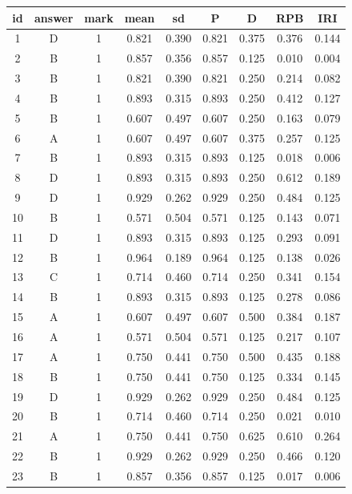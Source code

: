 \documentclass[hyperref,adobefonts]{ctexart}
\begin{document}
\begin{longtable}{c|c|c|c|c|c|c|c|c}
\hline
id & answer & mark & mean & sd & P & D & RPB & IRI\\
\hline
1 & D & 1 & 0.821 & 0.390 & 0.821 & 0.375 & 0.376 & 0.144\\
\hline
2 & B & 1 & 0.857 & 0.356 & 0.857 & 0.125 & 0.010 & 0.004\\
\hline
3 & B & 1 & 0.821 & 0.390 & 0.821 & 0.250 & 0.214 & 0.082\\
\hline
4 & B & 1 & 0.893 & 0.315 & 0.893 & 0.250 & 0.412 & 0.127\\
\hline
5 & B & 1 & 0.607 & 0.497 & 0.607 & 0.250 & 0.163 & 0.079\\
\hline
6 & A & 1 & 0.607 & 0.497 & 0.607 & 0.375 & 0.257 & 0.125\\
\hline
7 & B & 1 & 0.893 & 0.315 & 0.893 & 0.125 & 0.018 & 0.006\\
\hline
8 & D & 1 & 0.893 & 0.315 & 0.893 & 0.250 & 0.612 & 0.189\\
\hline
9 & D & 1 & 0.929 & 0.262 & 0.929 & 0.250 & 0.484 & 0.125\\
\hline
10 & B & 1 & 0.571 & 0.504 & 0.571 & 0.125 & 0.143 & 0.071\\
\hline
11 & D & 1 & 0.893 & 0.315 & 0.893 & 0.125 & 0.293 & 0.091\\
\hline
12 & B & 1 & 0.964 & 0.189 & 0.964 & 0.125 & 0.138 & 0.026\\
\hline
13 & C & 1 & 0.714 & 0.460 & 0.714 & 0.250 & 0.341 & 0.154\\
\hline
14 & B & 1 & 0.893 & 0.315 & 0.893 & 0.125 & 0.278 & 0.086\\
\hline
15 & A & 1 & 0.607 & 0.497 & 0.607 & 0.500 & 0.384 & 0.187\\
\hline
16 & A & 1 & 0.571 & 0.504 & 0.571 & 0.125 & 0.217 & 0.107\\
\hline
17 & A & 1 & 0.750 & 0.441 & 0.750 & 0.500 & 0.435 & 0.188\\
\hline
18 & B & 1 & 0.750 & 0.441 & 0.750 & 0.125 & 0.334 & 0.145\\
\hline
19 & D & 1 & 0.929 & 0.262 & 0.929 & 0.250 & 0.484 & 0.125\\
\hline
20 & B & 1 & 0.714 & 0.460 & 0.714 & 0.250 & 0.021 & 0.010\\
\hline
21 & A & 1 & 0.750 & 0.441 & 0.750 & 0.625 & 0.610 & 0.264\\
\hline
22 & B & 1 & 0.929 & 0.262 & 0.929 & 0.250 & 0.466 & 0.120\\
\hline
23 & B & 1 & 0.857 & 0.356 & 0.857 & 0.125 & 0.017 & 0.006\\

\end{longtable}
\end{document}
